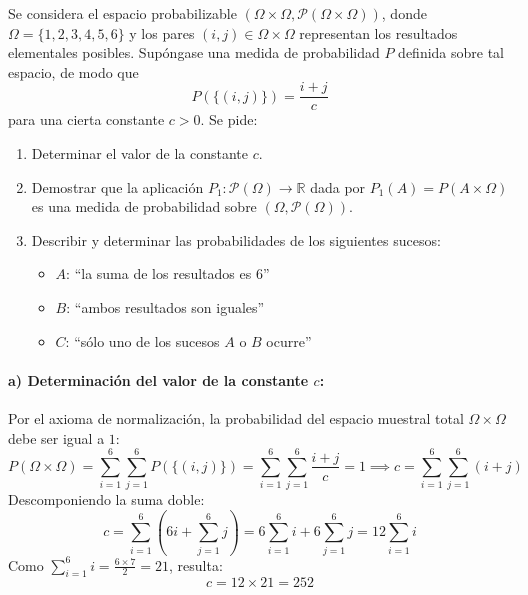 \begin{problema}
Se considera el espacio probabilizable $(\Omega \times \Omega, \mathcal{P}(\Omega \times \Omega))$, donde $\Omega = \{1, 2, 3, 4, 5, 6\}$ y los pares $(i,j) \in \Omega \times \Omega$ representan los resultados elementales posibles. Supóngase una medida de probabilidad $P$ definida sobre tal espacio, de modo que
\[P(\{(i,j)\}) = \frac{i+j}{c}\]
para una cierta constante $c > 0$. Se pide:
\begin{enumerate}[label=\alph*)]
    \item Determinar el valor de la constante $c$.
    \item Demostrar que la aplicación $P_1 : \mathcal{P}(\Omega) \to \mathbb{R}$ dada por $P_1(A) = P(A \times \Omega)$ es una medida de probabilidad sobre $(\Omega, \mathcal{P}(\Omega))$.
    \item Describir y determinar las probabilidades de los siguientes sucesos:
    \begin{itemize}
        \item $A$: "`la suma de los resultados es $6$"'
        \item $B$: "`ambos resultados son iguales"'
        \item $C$: "`sólo uno de los sucesos $A$ o $B$ ocurre"'
    \end{itemize}
\end{enumerate}

\tcblower

\paragraph{a) Determinación del valor de la constante $c$:}
Por el axioma de normalización, la probabilidad del espacio muestral total $\Omega \times \Omega$ debe ser igual a $1$:
\[P(\Omega \times \Omega) = \sum_{i=1}^6 \sum_{j=1}^6 P(\{(i,j)\}) = \sum_{i=1}^6 \sum_{j=1}^6 \frac{i+j}{c} = 1 \implies c = \sum_{i=1}^6 \sum_{j=1}^6 (i+j)\]
Descomponiendo la suma doble:
\[c = \sum_{i=1}^6 \left( 6i + \sum_{j=1}^6 j \right) = 6 \sum_{i=1}^6 i + 6 \sum_{j=1}^6 j = 12 \sum_{i=1}^6 i\]
Como $\sum_{i=1}^6 i = \frac{6 \times 7}{2} = 21$, resulta:
\[c = 12 \times 21 = 252\]


\end{problema}

